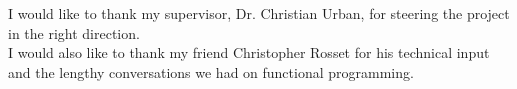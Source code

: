 I would like to thank my supervisor, Dr. Christian Urban, for steering the project in the right direction. \\ I would also like to thank my friend Christopher Rosset for his technical input and the lengthy conversations we had on functional programming.

